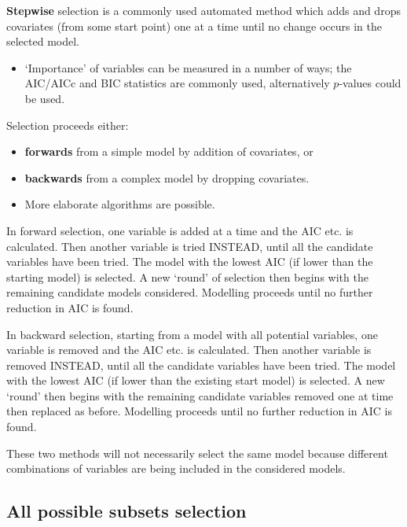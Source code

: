 \documentclass[
  oneside]{krantz}
\providecommand{\tightlist}{%
  \setlength{\itemsep}{0pt}\setlength{\parskip}{0pt}}
\begin{document}
\textbf{Stepwise} selection is a commonly used automated method which adds and drops covariates (from some start point) one at a time until no change occurs in the selected model.

\begin{itemize}
\tightlist
\item
  `Importance' of variables can be measured in a number of ways; the AIC/AICc and BIC statistics are commonly used, alternatively \(p\)-values could be used.
\end{itemize}

Selection proceeds either:

\begin{itemize}
\tightlist
\item
  \textbf{forwards} from a simple model by addition of covariates, or
\item
  \textbf{backwards} from a complex model by dropping covariates.
\item
  More elaborate algorithms are possible.
\end{itemize}

In forward selection, one variable is added at a time and the AIC etc. is calculated. Then another variable is tried INSTEAD, until all the candidate variables have been tried. The model with the lowest AIC (if lower than the starting model) is selected. A new `round' of selection then begins with the remaining candidate models considered. Modelling proceeds until no further reduction in AIC is found.

In backward selection, starting from a model with all potential variables, one variable is removed and the AIC etc. is calculated. Then another variable is removed INSTEAD, until all the candidate variables have been tried. The model with the lowest AIC (if lower than the existing start model) is selected. A new `round' then begins with the remaining candidate variables removed one at time then replaced as before. Modelling proceeds until no further reduction in AIC is found.

These two methods will not necessarily select the same model because different combinations of variables are being included in the considered models.

\hypertarget{all-possible-subsets-selection}{%
\subsection{All possible subsets selection}\label{all-possible-subsets-selection}}
\end{document}

